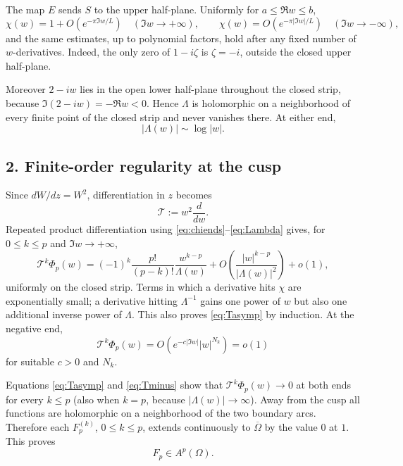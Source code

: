 \documentclass[11pt]{article}
\begin{document}
The map $E$ sends $S$ to the upper half-plane.  Uniformly for
$a\leq\Re w\leq b$,
\begin{equation}\label{eq:chiends}
 \chi(w)=1+O(e^{-\pi\Im w/L})\quad(\Im w\to+\infty),
 \qquad
 \chi(w)=O(e^{-\pi|\Im w|/L})\quad(\Im w\to-\infty),
\end{equation}
and the same estimates, up to polynomial factors, hold after any fixed
number of $w$-derivatives.  Indeed, the only zero of $1-i\zeta$ is
$\zeta=-i$, outside the closed upper half-plane.

Moreover $2-iw$ lies in the open lower half-plane throughout the closed
strip, because $\Im(2-iw)=-\Re w<0$.  Hence $\Lambda$ is holomorphic on a
neighborhood of every finite point of the closed strip and never vanishes
there.  At either end,
\begin{equation}\label{eq:Lambda}
 |\Lambda(w)|\sim\log|w|.
\end{equation}

\subsection*{2. Finite-order regularity at the cusp}

Since $dW/dz=W^2$, differentiation in $z$ becomes
\[
 \mathcal T:=w^2\frac{d}{dw}.
\]
Repeated product differentiation using \eqref{eq:chiends}--\eqref{eq:Lambda}
gives, for $0\leq k\leq p$ and $\Im w\to+\infty$,
\begin{equation}\label{eq:Tasymp}
 \mathcal T^k\Phi_p(w)
 =(-1)^k\frac{p!}{(p-k)!}\frac{w^{k-p}}{\Lambda(w)}
 +O\!\left(\frac{|w|^{k-p}}{|\Lambda(w)|^2}\right)+o(1),
\end{equation}
uniformly on the closed strip.  Terms in which a derivative hits $\chi$
are exponentially small; a derivative hitting $\Lambda^{-1}$ gains one
power of $w$ but also one additional inverse power of $\Lambda$.  This also
proves \eqref{eq:Tasymp} by induction.  At the negative end,
\begin{equation}\label{eq:Tminus}
 \mathcal T^k\Phi_p(w)=O(e^{-c|\Im w|}|w|^{N_k})=o(1)
\end{equation}
for suitable $c>0$ and $N_k$.

Equations \eqref{eq:Tasymp} and \eqref{eq:Tminus} show that
$\mathcal T^k\Phi_p(w)\to0$ at both ends for every $k\leq p$ (also when
$k=p$, because $|\Lambda(w)|\to\infty$).  Away from the cusp all functions
are holomorphic on a neighborhood of the two boundary arcs.  Therefore each
$F_p^{(k)}$, $0\leq k\leq p$, extends continuously to $\overline\Omega$ by
the value $0$ at $1$.  This proves
\begin{equation}\label{eq:Ap}
 F_p\in A^p(\Omega).
\end{equation}
\end{document}
